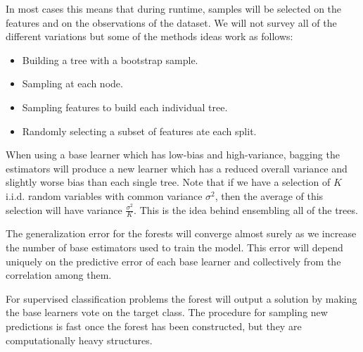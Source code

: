 	In most cases this means that during runtime, samples will be selected on the features and on the observations of the dataset. We will not survey all of the different variations but some of the methods ideas work as follows:
	
	\begin{itemize}
		\item Building a tree with a bootstrap sample.
		\item Sampling at each node.
		\item Sampling features to build each individual tree.
		\item Randomly selecting a subset of features ate each split.
	\end{itemize}

When using a base learner which has low-bias and high-variance, bagging the estimators will produce a new learner which has a reduced overall variance and slightly worse bias than each single tree. Note that if we have a selection of $K$ i.i.d. random variables with common variance $\sigma^2$, then the average of this selection will have variance $\frac{\sigma^2}{K}$. This is the idea behind ensembling all of the trees.

The generalization error for the forests will converge almost surely as we increase the number of base estimators used to train the model. This error will depend uniquely on the predictive error of each base learner and collectively from the correlation among them.

For supervised classification problems the forest will output a solution by making the base learners vote on the  target class. The procedure for sampling new predictions is fast once the forest has been constructed, but they are computationally heavy structures.
